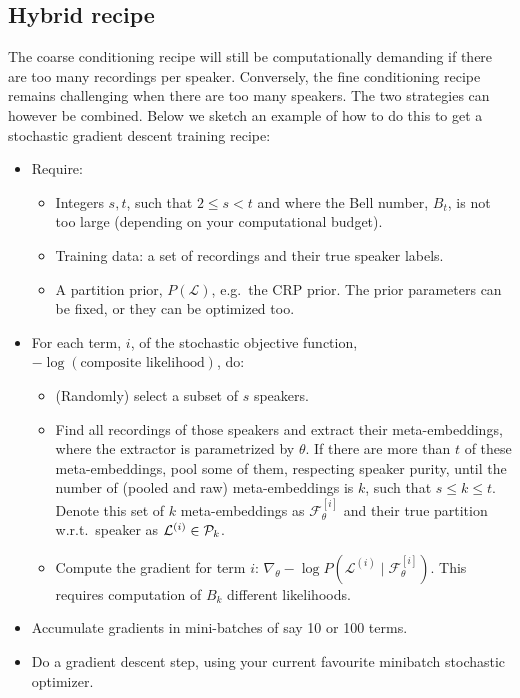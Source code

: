 \documentclass[a4paper,oneside,12pt,english]{report}
\def\Lset{\mathcal{L}}
\def\Fset{\mathcal{F}}
\begin{document}
\subsection{Hybrid recipe}
The coarse conditioning recipe will still be computationally demanding if there are too many recordings per speaker. Conversely, the fine conditioning recipe remains challenging when there are too many speakers. The two strategies can however be combined. Below we sketch an example of how to do this to get a stochastic gradient descent training recipe: 
\begin{itemize}
  \item Require: 
	\begin{itemize}
		\item Integers $s,t$, such that $2\le s < t$ and where the Bell number, $B_t$, is not too large (depending on your computational budget).
		\item Training data: a set of recordings and their true speaker labels.
		\item A partition prior, $P(\Lset)$, e.g.\ the CRP prior. The prior parameters can be fixed, or they can be optimized too.
	\end{itemize}
	\item For each term, $i$, of the stochastic objective function, $-\log(\text{composite likelihood})$, do:
	\begin{itemize}
	   \item (Randomly) select a subset of $s$ speakers.
	   \item Find all recordings of those speakers and extract their meta-embeddings, where the extractor is parametrized by $\theta$. If there are more than $t$ of these meta-embeddings, pool some of them, respecting speaker purity, until the number of (pooled and raw) meta-embeddings is $k$, such that $s\le k \le t$. Denote this set of $k$ meta-embeddings as $\Fset^{[i]}_\theta$ and their true partition w.r.t.\ speaker as $\Lset^{(i)}\in\Pset_k$.
		\item Compute the gradient for term $i$: $\nabla_\theta -\log P(\Lset^{(i)}\mid\Fset^{[i]}_\theta)$. This requires computation of $B_k$ different likelihoods.
  \end{itemize}
  \item Accumulate gradients in mini-batches of say 10 or 100 terms.
	\item Do a gradient descent step, using your current favourite minibatch stochastic optimizer.
\end{itemize}
  
\end{document}
